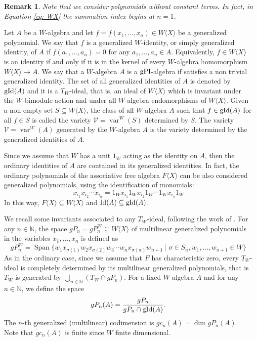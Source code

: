 \documentclass{article}
\newtheorem{remark}[theorem]{Remark}
\newcommand{\WX}{W\langle X\rangle}
\newcommand{\FX}{F\langle X\rangle}
\newcommand{\bN}{\mathbb{N}}
\newcommand{\cV}{\mathcal{V}}
\DeclareMathOperator{\spn}{Span}
\DeclareMathOperator{\gpi}{\textnormal{gPI}}
\DeclareMathOperator{\gid}{\textnormal{gId}}
\DeclareMathOperator{\id}{\textnormal{Id}}
\DeclareMathOperator{\var}{var}
\begin{document}
\begin{remark}\label{rem: constant term}
Note that we consider polynomials without constant terms. In fact, in Equation \eqref{eq: WX} the summation index begins at $n=1$.
\end{remark}

Let $A$ be a $W$-algebra and let $f=f(x_1,\ldots,x_n) \in W\langle X \rangle$ be a generalized polynomial. We say that $f$ is a generalized $W$-identity, or simply generalized identity, of $A$ if $f(a_1,\ldots,a_n)=0$ for any $a_1,\ldots,a_n \in A$. Equivalently, $f\in W\langle X \rangle$ is an identity if and only if it is in the kernel of every $W$-algebra homomorphism $\WX\rightarrow A$. We say that a $W$-algebra $A$ is a $\gpi$-algebra if satisfies a non trivial generalized identity. The set of all generalized identities of $A$ is denoted by $\gid(A)$ and it is a $T_W$-ideal, that is, an ideal of $W\langle X \rangle$ which is invariant under the $W$-bimodule action and under all  $W$-algebra endomorphisms of $W\langle X \rangle$. Given a non-empty set $S \subseteq W \langle X \rangle$, the class of all $W$-algebra $A$ such that $f\in\gid(A)$ for all $f \in S$ is called the variety $\mathcal{V}=\var^W(S)$ determined by $S$. The variety $\cV=\var^W(A)$ generated by the $W$-algebra $A$ is the variety determined by the generalized identities of $A$.

Since we assume that $W$ has a unit $1_W$ acting as the identity on $A$, then the ordinary identities of $A$ are contained in its generalized identities. In fact, the ordinary polynomials of the associative free algebra $\FX$ can be also considered generalized polynomials, using the identification of monomials: \[x_{i_1}x_{i_2}\cdots x_{i_n} = 1_Wx_{i_1}1_Wx_{i_2}1_W\cdots 1_Wx_{i_n}1_W\]
In this way, $\FX\subseteq \WX$ and $\id(A)\subseteq \gid(A)$.


We recall some invariants associated to any $T_W$-ideal, following the work of \cite{MR25a}.
For any $n\in \bN$, the space $gP_n=gP_n^W\subseteq\WX$ of multilinear generalized polynomials in the variables $x_1,\dots,x_n$ is defined as
\[ gP_n^W =\spn\{ w_1x_{\sigma(1)}w_2x_{\sigma(2)}w_3\cdots w_nx_{\sigma(n)}w_{n+1} \mid \sigma\in S_n, w_1,\dots,w_{n+1} \in W \}  \]
As in the ordinary case, since we assume that $F$ has characteristic zero, every $T_W$-ideal is completely determined by its multilinear generalized polynomials, that is $T_W$ is generated by $\bigcup_{n\in\bN} (T_W\cap gP_n)$. For a fixed $W$-algebra $A$ and for any $n\in\bN$, we define the space
\[ gP_n(A)=\frac{gP_n}{gP_n\cap \gid(A)}. \]
The $n$-th generalized (multilinear) codimension is $gc_n(A)=\dim gP_n(A)$. Note that $gc_n(A)$ is finite since $W$ finite dimensional. 
\end{document}
